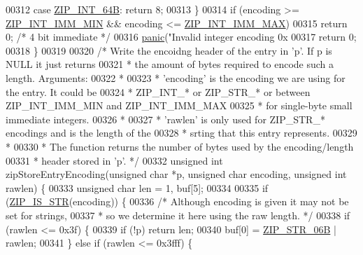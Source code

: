 \begin{DoxyCode}
00312     \textcolor{keywordflow}{case} \hyperlink{ziplist_8c_a1f551b3ab3a4d79190f367e59d6dab0a}{ZIP\_INT\_64B}: \textcolor{keywordflow}{return} 8;
00313     \}
00314     \textcolor{keywordflow}{if} (encoding >= \hyperlink{ziplist_8c_af5120069edca0811f31d130674a0de47}{ZIP\_INT\_IMM\_MIN} && encoding <= 
      \hyperlink{ziplist_8c_a69ea30cd75038067a13d2151a1c741ad}{ZIP\_INT\_IMM\_MAX})
00315         \textcolor{keywordflow}{return} 0; \textcolor{comment}{/* 4 bit immediate */}
00316     \hyperlink{redisassert_8h_a1445e207e36c97ff84c54b47288cea19}{panic}(\textcolor{stringliteral}{"Invalid integer encoding 0x%
00317     \textcolor{keywordflow}{return} 0;
00318 \}
00319 
00320 \textcolor{comment}{/* Write the encoidng header of the entry in 'p'. If p is NULL it just returns}
00321 \textcolor{comment}{ * the amount of bytes required to encode such a length. Arguments:}
00322 \textcolor{comment}{ *}
00323 \textcolor{comment}{ * 'encoding' is the encoding we are using for the entry. It could be}
00324 \textcolor{comment}{ * ZIP\_INT\_* or ZIP\_STR\_* or between ZIP\_INT\_IMM\_MIN and ZIP\_INT\_IMM\_MAX}
00325 \textcolor{comment}{ * for single-byte small immediate integers.}
00326 \textcolor{comment}{ *}
00327 \textcolor{comment}{ * 'rawlen' is only used for ZIP\_STR\_* encodings and is the length of the}
00328 \textcolor{comment}{ * srting that this entry represents.}
00329 \textcolor{comment}{ *}
00330 \textcolor{comment}{ * The function returns the number of bytes used by the encoding/length}
00331 \textcolor{comment}{ * header stored in 'p'. */}
00332 \textcolor{keywordtype}{unsigned} \textcolor{keywordtype}{int} zipStoreEntryEncoding(\textcolor{keywordtype}{unsigned} \textcolor{keywordtype}{char} *p, \textcolor{keywordtype}{unsigned} \textcolor{keywordtype}{char} encoding, \textcolor{keywordtype}{unsigned} \textcolor{keywordtype}{int} rawlen) \{
00333     \textcolor{keywordtype}{unsigned} \textcolor{keywordtype}{char} len = 1, buf[5];
00334 
00335     \textcolor{keywordflow}{if} (\hyperlink{ziplist_8c_a2cb79e478d5bda74592c92230cfd6761}{ZIP\_IS\_STR}(encoding)) \{
00336         \textcolor{comment}{/* Although encoding is given it may not be set for strings,}
00337 \textcolor{comment}{         * so we determine it here using the raw length. */}
00338         \textcolor{keywordflow}{if} (rawlen <= 0x3f) \{
00339             \textcolor{keywordflow}{if} (!p) \textcolor{keywordflow}{return} len;
00340             buf[0] = \hyperlink{ziplist_8c_aa60ad99f14e9fc441ba912c694f2e9ae}{ZIP\_STR\_06B} | rawlen;
00341         \} \textcolor{keywordflow}{else} \textcolor{keywordflow}{if} (rawlen <= 0x3fff) \{
}
\end{DoxyCode}
